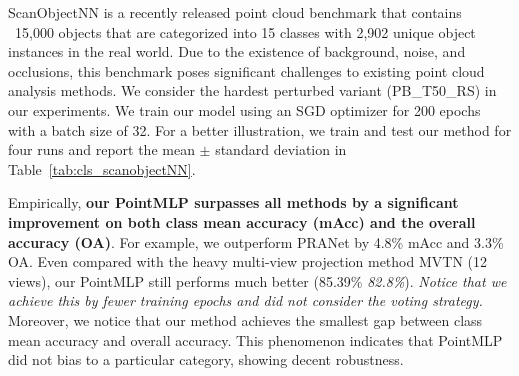 ScanObjectNN is a recently released point cloud benchmark that contains ~15,000 objects that are categorized into 15 classes with 2,902 unique object instances in the real world. Due to the existence of background, noise, and occlusions, this benchmark poses significant challenges to existing point cloud analysis methods. We consider the hardest perturbed variant (PB\_T50\_RS) in our experiments. We train our model using an SGD optimizer for 200 epochs with a batch size of 32. For a better illustration, we train and test our method for four runs and report the mean $\pm$ standard deviation in Table~\ref{tab:cls_scanobjectNN}.

Empirically, \textbf{our PointMLP surpasses all methods by a significant improvement on both class mean accuracy (mAcc) and the overall accuracy (OA)}. For example, we outperform PRANet by 4.8\% mAcc and 3.3\% OA. Even compared with the heavy multi-view projection method MVTN (12 views), our PointMLP still performs much better (85.39\% \textit{82.8\%}). \textit{Notice that we achieve this by fewer training epochs and did not consider the voting strategy.}
Moreover, we notice that our method achieves the smallest gap between class mean accuracy and overall accuracy. This phenomenon indicates that PointMLP did not bias to a particular category, showing decent robustness.

